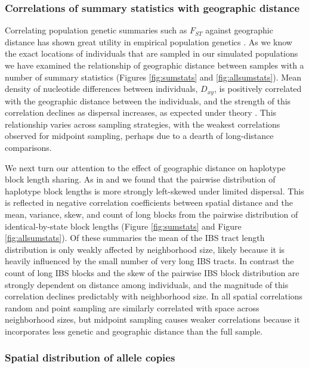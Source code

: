 \documentclass[11pt,twoside,lineno]{preprint}
\newif\ifcomments
\newcommand{\plr}[1]{\ifcomments{{\color{purple} \it (#1)}}\else{}\fi}
\begin{document}
\subsubsection{Correlations of summary statistics with geographic distance}
Correlating population genetic summaries such as $F_{ST}$ against geographic distance has shown great utility in empirical population genetics \citep{Rousset1997}. As we know the exact locations of individuals that are sampled in our simulated populations we have examined the relationship of geographic distance between samples with a number of summary statistics (Figures \ref{fig:sumstats} and \ref{fig:allsumstats}). 
Mean density of nucleotide differences between individuals, $D_{xy}$, is positively correlated with the geographic distance between the individuals,
and the strength of this correlation declines as dispersal increases, as expected under theory \citep{Wright1943,Rousset1997}. 
This relationship varies across sampling strategies, with the weakest correlations observed for midpoint sampling,
perhaps due to a dearth of long-distance comparisons.

\plr{peter to revisit this paragraph}
We next turn our attention to the effect of geographic distance on haplotype block length sharing. 
As in \citet{Ringbauer2017} and \citet{Baharian2016} we found that the pairwise distribution of haplotype block lengths is more strongly left-skewed under limited dispersal. This is reflected in negative correlation coefficients between spatial distance and the mean, variance, skew, and count of long blocks from the pairwise distribution of identical-by-state block lengths (Figure \ref{fig:sumstats} and Figure \ref{fig:allsumstats}). Of these summaries the mean of the IBS tract length distribution is only weakly affected by neighborhood size, likely because it is heavily influenced by the small number of very long IBS tracts. In contrast the count of long IBS blocks and the skew of the pairwise IBS block distribution are strongly dependent on distance among individuals, and the magnitude of this correlation declines predictably with neighborhood size. In all spatial correlations random and point sampling are similarly correlated with space across neighborhood sizes, but midpoint sampling causes weaker correlations because it incorporates less genetic and geographic distance than the full sample. 

\subsubsection{Spatial distribution of allele copies}
\plr{insert bit describing that plot here}
\end{document}
